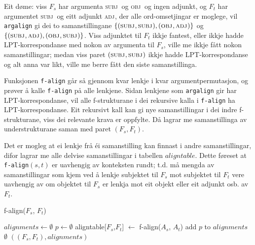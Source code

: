 \documentclass[11pt,a4paper,oneside,draft]{book}
\newcommand{\F}[2]{\textsc{#1}\ensuremath{_{#2}}}
\newcommand{\OBJ}{\F{obj}{}}
\newcommand{\OBJs}{\F{obj~}{}}
\newcommand{\ADJ}{\F{adj}{}}
\newcommand{\SUBJ}{\F{subj}{}}
\newcommand{\SUBJs}{\F{subj~}{}}
\begin{document}
Eit døme: viss $F_s$ har argumenta \SUBJs og \OBJs og ingen adjunkt,
og $F_t$ har argumentet \SUBJs og eitt adjunkt \ADJ, der alle
ord-omsetjingar er moglege, vil \texttt{argalign} gi dei to samanstillingane
$\{(\SUBJ,\SUBJ), (\OBJ,\ADJ)\}$ og $\{(\SUBJ,\ADJ),
(\OBJ,\SUBJ)\}$. Viss adjunktet til $F_t$ ikkje fantest, eller ikkje
hadde LPT-korrespondanse med nokon av argumenta til $F_s$, ville me
ikkje fått nokon samanstillingar; medan viss paret $(\SUBJ,\SUBJ)$
ikkje hadde LPT-korrespondanse og alt anna var likt, ville me berre
fått den siste samanstillinga.

Funksjonen \texttt{f-align} går så gjennom kvar lenkje i kvar
argumentpermutasjon, og prøver å kalle \texttt{f-align} på alle
lenkjene. Sidan lenkjene som \texttt{argalign} gir har LPT-korrespondanse,
vil alle f-strukturane i dei rekursive kalla i \texttt{f-align} ha
LPT-korrespondanse. Eit rekursivt kall kan gi nye samanstillingar i
dei indre f-strukturane, viss dei relevante krava er oppfylte. Då
lagrar me samanstillinga av understrukturane saman med paret
$(F_s,F_t)$.

Det er mogleg at ei lenkje frå éi samanstilling kan finnast i andre
samanstillingar, difor lagrar me alle delvise samanstillingar i
tabellen $aligntable$. Dette føreset at \texttt{f-align}$(s,t)$ er
uavhengig av konteksten rundt; t.d. må mengda av samanstillingar som
kjem ved å lenkje subjektet til $F_s$ mot subjektet til $F_t$ vere
uavhengig av om objektet til $F_s$ er lenkja mot eit objekt eller eit
adjunkt osb. av $F_t$. 


     \begin{algorithm}[]
      \caption{f-align($F_s$, $F_t$)}
      \label{algo:f-align}
      
      $alignments \gets \emptyset$  \;
       {
        $p \gets \emptyset$ \;
          {
            {
           aligntable[$F_s$,$F_t$] $\gets$ f-align($A_s$, $A_t$)\;
           }
        }
        add $p$ to $alignments$ \;
       }
        \Return $\emptyset$ 
       \lElse \Return $((F_s, F_t), alignments)$ \;
       \end{algorithm}    
    
\end{document}
